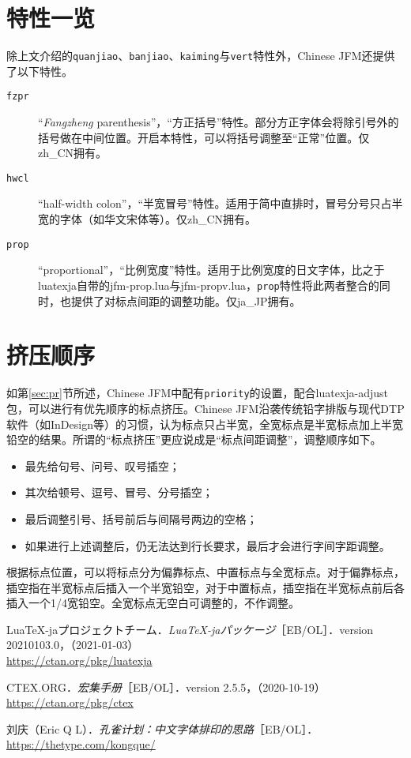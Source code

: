 \documentclass[a4paper , zihao=-4 , fontset=adobe , punct=zh_CN/kaiming]{ctexart}
\begin{document}
\section{特性一览}
除上文介绍的\+\verb|quanjiao|、\verb|banjiao|、\verb|kaiming|与\+\verb|vert|特性外，\textsf{Chinese JFM}还提供了以下特性。

\begin{description}
    \item[\texttt{fzpr}] “\textit{Fangzheng} parenthesis”，“方正括号”特性。部分方正字体会将除引号外的括号做在中间位置。开启本特性，可以将括号调整至“正常”位置。仅\textsf{zh\_CN}拥有。
    \item[\texttt{hwcl}] “half-width colon”，“半宽冒号”特性。适用于简中直排时，冒号分号只占半宽的字体（如华文宋体等）。仅\textsf{zh\_CN}拥有。
    \item[\texttt{prop}] “proportional”，“比例宽度”特性。适用于比例宽度的日文字体，比之于\textsf{lua\-texja}自带的\textsf{jfm-prop.lua}与\textsf{jfm-propv.lua}，\verb|prop|特性将此两者整合的同时，也提供了对标点间距的调整功能。仅\textsf{ja\_JP}拥有。
\end{description}

\section{挤压顺序}
如第\ref{sec:pr}节所述，\textsf{Chinese JFM}中配有\+\verb|priority|的设置，配合\textsf{luatexja-adjust}包，可以进行有优先顺序的标点挤压。\textsf{Chinese JFM}沿袭传统铅字排版与现代DTP软件（如InDesign等）的习惯，认为标点只占半宽，全宽标点是半宽标点加上半宽铅空的结果。所谓的“标点挤压”更应说成是“标点间距调整”，调整顺序如下。
\begin{itemize}
    \item 最先给句号、问号、叹号插空；
    \item 其次给顿号、逗号、冒号、分号插空；
    \item 最后调整引号、括号前后与间隔号两边的空格；
    \item 如果进行上述调整后，仍无法达到行长要求，最后才会进行字间字距调整。
\end{itemize}

根据标点位置，可以将标点分为偏靠标点、中置标点与全宽标点。对于偏靠标点，插空指在半宽标点后插入一个半宽铅空，对于中置标点，插空指在半宽标点前后各插入一个1/4宽铅空。全宽标点无空白可调整的，不作调整。

\nocite{*}
\begin{thebibliography}{9}
 Lua\TeX-jaプロジェクトチーム．\textit{Lua\TeX-jaパッケージ}［EB/OL］．version 20210103.0，（2021-01-03）\\\mbox{}
\hfill\url{https://ctan.org/pkg/luatexja}

 CTEX.ORG．\textit{\CTeX{}宏集手册}［EB/OL］．version 2.5.5，（2020-10-19）\\\mbox{}
\hfill\url{https://ctan.org/pkg/ctex}

 刘庆（Eric Q L）．\textit{孔雀计划：中文字体排印的思路}［EB/OL］．\\\mbox{}
\hfill\url{https://thetype.com/kongque/}
\end{thebibliography}
\end{document}
